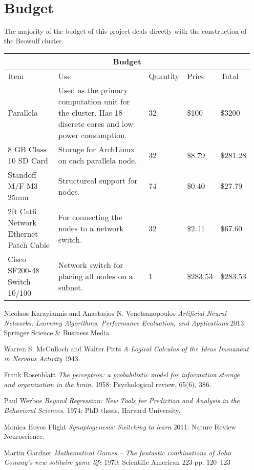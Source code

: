 \documentclass[letter]{article}
\begin{document}
\section{Budget}
The majority of the budget of this project deals directly with the construction of the Beowulf cluster.


\vspace{7mm}
\centering
\begin{tabular}{ |p{2cm}|p{6cm}|p{1.5cm}|p{1cm}| p{1.5cm}|
 }
 \hline
 \multicolumn{5}{|c|}{Budget} \\
 \hline
Item& Use& Quantity&Price & Total\\
 \hline
  Parallela & Used as the primary computation unit for the cluster.  Has 18 discrete cores and low power
  consumption.  & 32 & \$100  & \$3200\\
  \hline
  8 GB Class 10 SD Card & Storage for ArchLinux on each parallela node. &32 &\$8.79 &\$281.28 \\
    \hline
  Standoff M/F M3 25mm &Structureal support for nodes. &74 &\$0.40 &\$27.79 \\
    \hline
  2ft Cat6 Network Ethernet Patch Cable & For connecting the nodes to a network switch. &32 &\$2.11 &\$67.60 \\
   \hline
  Cisco SF200-48 Switch 10/100 & Network switch for placing all nodes on a subnet. &1 &\$283.53 &\$283.53 \\

 \hline
\end{tabular}
\begin{thebibliography}{1}
     Nicolaos Karayiannis and Anastasios N. Venetsanopoulos {\em
    Artificial Neural Networks: Learning Algorithms, Performance Evaluation, and Applications} 2013: Springer Science
    & Business Media.

     Warren S. McCulloch and Walter Pitts {\em A Logical Calculus of the Ideas Immanent in Nervous Activity} 1943.

     Frank Rosenblatt {\em The perceptron: a probabilistic model for information storage and organization in the brain.}
    1958: Psychological review, 65(6), 386.

     Paul Werbos {\em Beyond Regression: New Tools for Prediction and Analysis in the Behavioral Sciences.} 1974: PhD thesis,
    Harvard University.

     Monica Hoyos Flight {\em Synaptogenesis: Switching to learn} 2011: Nature Review Neuroscience.

     Martin Gardner {\em Mathematical Games – The fantastic combinations of John Conway's new solitaire game life} 1970:
     Scientific American 223 pp. 120–123

\end{thebibliography}
\end{document}
